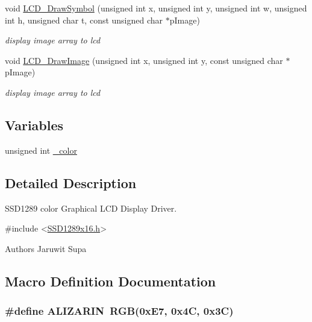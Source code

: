 \begin{DoxyCompactItemize}
void \hyperlink{group___s_s_d1289_gab6b9360350119d9db001227f1ead6f67}{L\+C\+D\+\_\+\+Draw\+Symbol} (unsigned int x, unsigned int y, unsigned int w, unsigned int h, unsigned char t, const unsigned char $\ast$p\+Image)
\begin{DoxyCompactList}\small\item\em display image array to lcd \end{DoxyCompactList}\item 
void \hyperlink{group___s_s_d1289_ga6c3731dbcd49b5cee77a323faedbc4d5}{L\+C\+D\+\_\+\+Draw\+Image} (unsigned int x, unsigned int y, const unsigned char $\ast$p\+Image)
\begin{DoxyCompactList}\small\item\em display image array to lcd \end{DoxyCompactList}\end{DoxyCompactItemize}
\subsection*{Variables}
\begin{DoxyCompactItemize}
\item 
unsigned int \hyperlink{group___s_s_d1289_ga00cf2e4785ac08040a181b166e244e4c}{\+\_\+color}
\end{DoxyCompactItemize}


\subsection{Detailed Description}
S\+S\+D1289 color Graphical L\+C\+D Display Driver. 


\begin{DoxyCode}
\textcolor{preprocessor}{#include <\hyperlink{_s_s_d1289x16_8h}{SSD1289x16.h}>} 
\end{DoxyCode}


\begin{DoxyAuthor}{Authors}
Jaruwit Supa 
\end{DoxyAuthor}


\subsection{Macro Definition Documentation}
\hypertarget{group___s_s_d1289_ga757247aee73022fde525a5381eacf66d}{}
\subsubsection[{A\+L\+I\+Z\+A\+R\+I\+N}]{\setlength{\rightskip}{0pt plus 5cm}\#define A\+L\+I\+Z\+A\+R\+I\+N~{\bf R\+G\+B}(0x\+E7, 0x4\+C, 0x3\+C)}\label{group___s_s_d1289_ga757247aee73022fde525a5381eacf66d}
\hypertarget{group___s_s_d1289_ga7b3b25cba33b07c303f3060fe41887f6}{}
